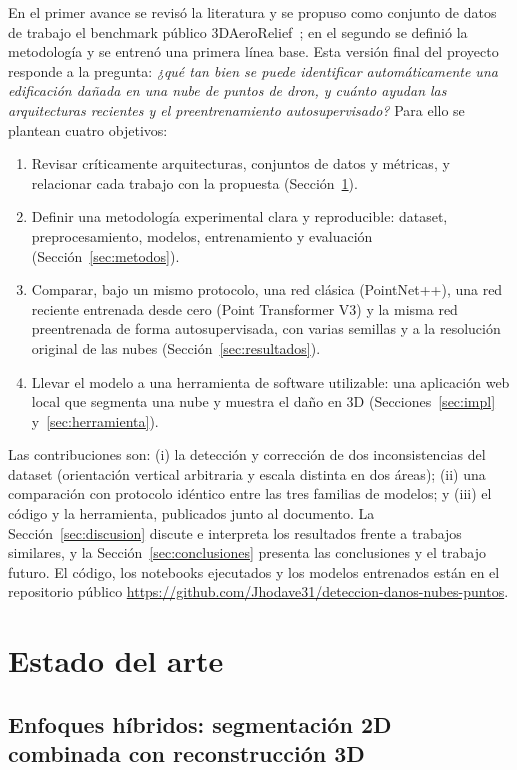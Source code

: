 \documentclass[5p]{elsarticle}
\begin{document}
En el primer avance se revisó la literatura y se propuso como conjunto de datos de trabajo el benchmark público 3DAeroRelief~\cite{Le2026}; en el segundo se definió la metodología y se entrenó una primera línea base. Esta versión final del proyecto responde a la pregunta: \emph{¿qué tan bien se puede identificar automáticamente una edificación dañada en una nube de puntos de dron, y cuánto ayudan las arquitecturas recientes y el preentrenamiento autosupervisado?} Para ello se plantean cuatro objetivos:
\begin{enumerate}
    \item Revisar críticamente arquitecturas, conjuntos de datos y métricas, y relacionar cada trabajo con la propuesta (Sección~\ref{sec:estado}).
    \item Definir una metodología experimental clara y reproducible: dataset, preprocesamiento, modelos, entrenamiento y evaluación (Sección~\ref{sec:metodos}).
    \item Comparar, bajo un mismo protocolo, una red clásica (PointNet++), una red reciente entrenada desde cero (Point Transformer V3) y la misma red preentrenada de forma autosupervisada, con varias semillas y a la resolución original de las nubes (Sección~\ref{sec:resultados}).
    \item Llevar el modelo a una herramienta de software utilizable: una aplicación web local que segmenta una nube y muestra el daño en 3D (Secciones~\ref{sec:impl} y~\ref{sec:herramienta}).
\end{enumerate}
Las contribuciones son: (i) la detección y corrección de dos inconsistencias del dataset (orientación vertical arbitraria y escala distinta en dos áreas); (ii) una comparación con protocolo idéntico entre las tres familias de modelos; y (iii) el código y la herramienta, publicados junto al documento. La Sección~\ref{sec:discusion} discute e interpreta los resultados frente a trabajos similares, y la Sección~\ref{sec:conclusiones} presenta las conclusiones y el trabajo futuro. El código, los notebooks ejecutados y los modelos entrenados están en el repositorio público \url{https://github.com/Jhodave31/deteccion-danos-nubes-puntos}.

\section{Estado del arte}\label{sec:estado}

\subsection{Enfoques híbridos: segmentación 2D combinada con reconstrucción 3D}
\end{document}
